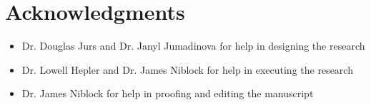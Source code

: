 \chapter*{Acknowledgments}
\label{ch:acknowledgements}

\begin{itemize}
	\item Dr. Douglas Jurs and Dr. Janyl Jumadinova for help in designing the research
	\item Dr. Lowell Hepler and Dr. James Niblock for help in executing the research
	\item Dr. James Niblock for help in proofing and editing the manuscript 
\end{itemize}